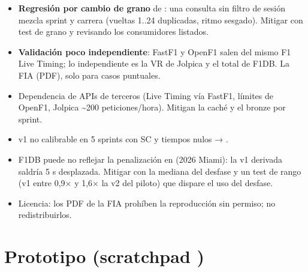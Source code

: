 \begin{itemize}
\item \textbf{Regresión por cambio de grano} de : una consulta sin filtro de sesión mezcla sprint y carrera (vueltas 1..24 duplicadas, ritmo sesgado). Mitigar con test de grano y revisando los consumidores listados.
\item \textbf{Validación poco independiente}: FastF1 y OpenF1 salen del mismo F1 Live Timing; lo independiente es la VR de Jolpica y el total de F1DB. La FIA (PDF), solo para casos puntuales.
\item Dependencia de APIs de terceros (Live Timing vía FastF1, límites de OpenF1, Jolpica \textasciitilde{}200 peticiones/hora). Mitigan la caché y el bronze por sprint.
\item v1 no calibrable en 5 sprints con SC y tiempos nulos → .
\item F1DB puede no reflejar la penalización en  (2026 Miami): la v1 derivada saldría 5 s desplazada. Mitigar con la mediana del desfase y un test de rango (v1 entre 0,9× y 1,6× la v2 del piloto) que dispare el uso del desfase.
\item Licencia: los PDF de la FIA prohíben la reproducción sin permiso; no redistribuirlos.
\end{itemize}

\section{Prototipo (scratchpad )}

